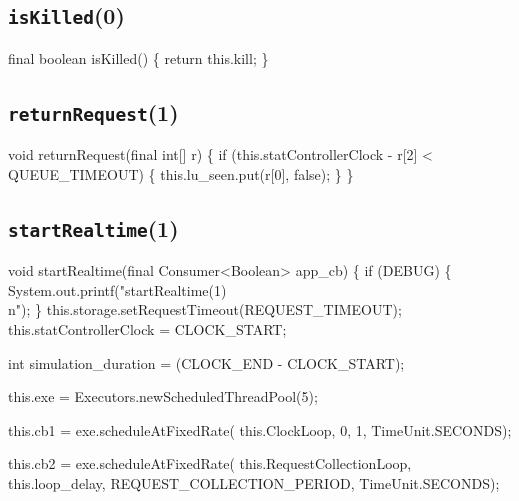 \subsection{\texttt{isKilled}(0)}
\nwenddocs{}\endmoddef{}
final boolean isKilled() \{
  return this.kill;
\}
\eatline
{}\nwendcode{}\nwdocspar
\subsection{\texttt{returnRequest}(1)}
\nwenddocs{}\endmoddef{}
void returnRequest(final int[] r) \{
  if (this.statControllerClock - r[2] < QUEUE_TIMEOUT) \{
    this.lu_seen.put(r[0], false);
  \}
\}
\eatline
{}\nwendcode{}\nwdocspar
\subsection{\texttt{startRealtime}(1)}
\nwenddocs{}\endmoddef{}
void startRealtime(final Consumer<Boolean> app_cb) \{
  if (DEBUG) \{
    System.out.printf("startRealtime(1)\\n");
  \}
  this.storage.setRequestTimeout(REQUEST_TIMEOUT);
  this.statControllerClock = CLOCK_START;

  int simulation_duration = (CLOCK_END - CLOCK_START);

  this.exe = Executors.newScheduledThreadPool(5);

  this.cb1 = exe.scheduleAtFixedRate(
    this.ClockLoop, 0, 1, TimeUnit.SECONDS);

  this.cb2 = exe.scheduleAtFixedRate(
    this.RequestCollectionLoop, this.loop_delay, REQUEST_COLLECTION_PERIOD, TimeUnit.SECONDS);

